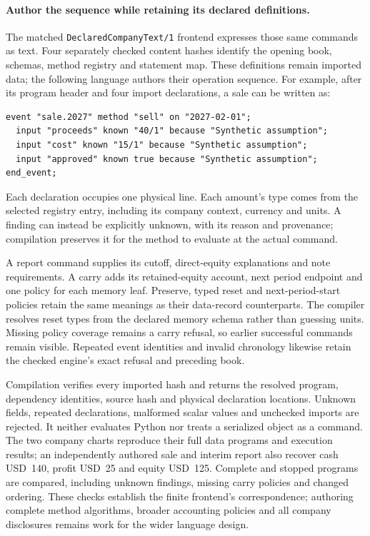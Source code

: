 \paragraph{Author the sequence while retaining its declared definitions.}
The matched \texttt{DeclaredCompanyText/1} frontend expresses those same commands
as text. Four separately checked content hashes identify the opening book,
schemas, method registry and statement map. These definitions remain imported
data; the following language authors their operation sequence. For example,
after its program header and four import declarations, a sale can be written as:
\begin{lstlisting}
event "sale.2027" method "sell" on "2027-02-01";
  input "proceeds" known "40/1" because "Synthetic assumption";
  input "cost" known "15/1" because "Synthetic assumption";
  input "approved" known true because "Synthetic assumption";
end_event;
\end{lstlisting}
Each declaration occupies one physical line. Each amount's type comes from
the selected registry entry, including its company context, currency and units.
A finding can instead be explicitly unknown, with its reason and provenance;
compilation preserves it for the method to evaluate at the actual command.

A report command supplies its cutoff, direct-equity explanations and note
requirements. A carry adds its retained-equity account, next period endpoint and
one policy for each memory leaf. Preserve, typed reset and next-period-start
policies retain the same meanings as their data-record counterparts. The compiler
resolves reset types from the declared memory schema rather than guessing units.
Missing policy coverage remains a carry refusal, so earlier successful commands
remain visible. Repeated event identities and invalid chronology likewise retain
the checked engine's exact refusal and preceding book.

Compilation verifies every imported hash and returns the resolved program,
dependency identities, source hash and physical declaration locations. Unknown
fields, repeated declarations, malformed scalar values and unchecked imports are
rejected. It neither evaluates Python nor treats a serialized object as a command.
The two company charts reproduce their full data programs and execution results;
an independently authored sale and interim report also recover cash USD~140,
profit USD~25 and equity USD~125. Complete and stopped programs are compared,
including unknown findings, missing carry policies and changed ordering. These
checks establish the finite frontend's correspondence; authoring complete method
algorithms, broader accounting policies and all company disclosures remains work
for the wider language design.


